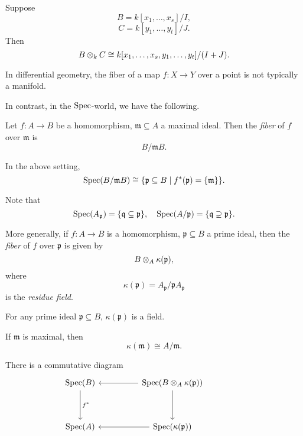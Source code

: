 \begin{corollary}
  Suppose
  \[ B = k[x_1, \dotsc, x_s] / {I},\]
  \[ C = k[y_1, \dotsc, y_t] /{J}.\]
  Then
  \[ B \otimes_k C \cong k[x_1, \dotsc, x_s, y_1, \dotsc, y_t] / {(I + J)}.\]
\end{corollary}

In differential geometry, the fiber of a map $f \colon X \to Y$ over a point is not typically a manifold.

In contrast, in the $\text{Spec}$-world, we have the following.

\begin{df}
  Let $f \colon A \to B$ be a homomorphism, $\mathfrak m \subseteq A$ a maximal ideal. Then the \textit{fiber} of $f$ over $\mathfrak m$ is
  \[ B /{\mathfrak m B}.\]
\end{df}

\begin{prop}
  In the above setting,
  \[\text{Spec}(B /{\mathfrak m B}) \cong \{ \mathfrak p \subseteq B \mathrel{|} f^*(\mathfrak p) = \{ \mathfrak m \} \}.\]
\end{prop}

Note that
\[ \text{Spec}(A_{\mathfrak p}) = \{ \mathfrak q \subseteq \mathfrak p\}, \quad
\text{Spec}(A /{\mathfrak p}) = \{ \mathfrak q \supseteq \mathfrak p\}.\]

\begin{df}
  More generally, if $f \colon A \to B$ is a homomorphism, $\mathfrak p \subseteq B$ a prime ideal, then the \textit{fiber} of $f$ over $\mathfrak p$ is given by
  \[ B \otimes_A \kappa(\mathfrak p),\]
  where
  \[ \kappa(\mathfrak p) = A_{\mathfrak p} / {\mathfrak p A_{\mathfrak p}}\]
  is the \textit{residue field}.
\end{df}

\begin{prop}
  For any prime ideal $\mathfrak p \subseteq B$, $\kappa(\mathfrak p)$ is a field.
\end{prop}

\begin{note}
  If $\mathfrak m$ is maximal, then
  \[ \kappa(\mathfrak m) \cong A / {\mathfrak m}.\]
\end{note}

\begin{prop}
  There is a commutative diagram
  \begin{equation*}
    \begin{tikzcd}[row sep = huge, column sep = huge]
      \spec(B) \arrow{d}{f^*}
      & \spec(B \tensor_A \kappa(\mathfrak p)) \arrow{l} \arrow{d} \\
      \spec(A) &
      \spec(\kappa(\mathfrak p)) \arrow{l}
      &
    \end{tikzcd}
  \end{equation*}
\end{prop}




